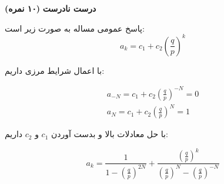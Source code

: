 \Large \textbf{درست نادرست}
\large \textbf{(۱۰ نمره)}

\normalsize \vspace{0.5cm}

پاسخ عمومی مساله به صورت زیر است:
$$
{a_k} = {c_1} + {c_2}{\left( {\frac{q}{p}} \right)^k}
$$

با اعمال شرایط مرزی داریم:

$$
\begin{array}{l}
	{a_{ - N}} = {c_1} + {c_2}{\left( {\frac{q}{p}} \right)^{ - N}} = 0\\
	{a_N} = {c_1} + {c_2}{\left( {\frac{q}{p}} \right)^N} = 1
\end{array}
$$

با حل معادلات بالا و بدست آوردن
${c_1}$
و
${c_2}$
داریم:

$$
{a_k} = \frac{1}{{1 - {{\left( {\frac{q}{p}} \right)}^{2N}}}} + \frac{{{{\left( {\frac{q}{p}} \right)}^k}}}{{{{\left( {\frac{q}{p}} \right)}^N} - {{\left( {\frac{q}{p}} \right)}^{ - N}}}}
$$
